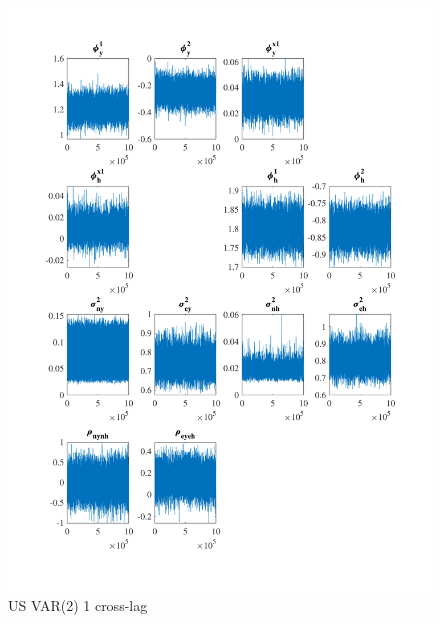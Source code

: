 \documentclass[
  12pt,
]{article}
\begin{document}
\begin{figure}

{\centering \includegraphics[width=0.85\linewidth]{../../Regression/Bayesian_UC_VAR2_drift_Crosscycle1lag/OutputData/posteriorchain_US} 

}

\caption{US VAR(2) 1 cross-lag}\label{fig:unnamed-chunk-19}
\end{figure}
\end{document}
